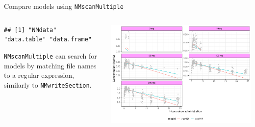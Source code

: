 \documentclass[
  8pt,
  ignorenonframetext,
  aspectratio=169]{beamer}
\begin{document}
\begin{frame}[fragile]{Compare models using \texttt{NMscanMultiple}}
\begin{columns}[T]
\begin{column}{0.45\textwidth}
\begin{verbatim}
## [1] "NMdata"     "data.table" "data.frame"
\end{verbatim}

\texttt{NMscanMultiple} can search for models by matching file names to
a regular expression, similarly to \texttt{NMwriteSection}.
\end{column}

\begin{column}{0.55\textwidth}
\normalsize

\begin{center}\includegraphics{plots/comparemodels-plot-1} \end{center}
\end{column}
\end{columns}
\end{frame}
\end{document}
